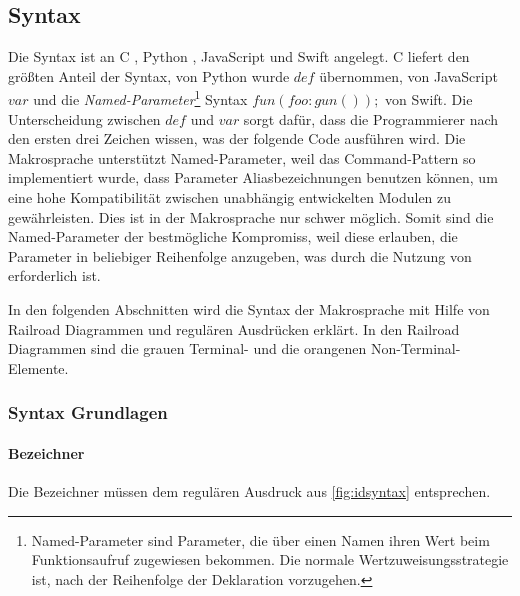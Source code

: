   \subsection{Syntax}
  \label{ssec:Syntax}
    Die Syntax ist an C \autocite{C-std}, Python \autocite{Python-std}, JavaScript \autocite{Ecma-std} und Swift \autocite{Swift-std} angelegt. C liefert den größten Anteil der Syntax, von Python wurde \myMIn$def$ übernommen, von JavaScript \myMIn$var$ und die \emph{Named-Parameter}\footnote{
      Named-Parameter sind Parameter, die über einen Namen ihren Wert beim Funktionsaufruf zugewiesen bekommen. Die normale Wertzuweisungsstrategie ist, nach der Reihenfolge der Deklaration vorzugehen.
    }
    Syntax \myMIn$fun(foo:gun());$ von Swift. Die Unterscheidung zwischen \myMIn$def$ und \myMIn$var$ sorgt dafür, dass die Programmierer nach den ersten drei Zeichen wissen, was der folgende Code ausführen wird. Die Makrosprache unterstützt Named-Parameter, weil das Command-Pattern so implementiert wurde, dass Parameter Aliasbezeichnungen benutzen können, um eine hohe Kompatibilität zwischen unabhängig entwickelten Modulen zu gewährleisten. Dies ist in der Makrosprache nur schwer möglich. Somit sind die Named-Parameter der bestmögliche Kompromiss, weil diese erlauben, die Parameter in beliebiger Reihenfolge anzugeben, was durch die Nutzung von  erforderlich ist.

    In den folgenden Abschnitten wird die Syntax der Makrosprache mit Hilfe von Railroad Diagrammen und regulären Ausdrücken erklärt. In den Railroad Diagrammen sind die grauen Terminal- und die orangenen Non-Terminal- Elemente.

    \subsubsection{Syntax Grundlagen}
    \label{sssec:Syntax Grundlagen}
      \paragraph{Bezeichner}
        Die Bezeichner müssen dem regulären Ausdruck aus \autoref{fig:idsyntax} entsprechen.

